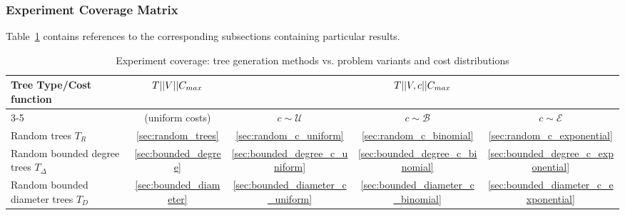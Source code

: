 \subsubsection*{Experiment Coverage Matrix}

Table~\ref{tab:experiment_matrix} contains references to the corresponding subsections containing particular results.

\begin{table}[!h]
\centering
\caption{Experiment coverage: tree generation methods vs. problem variants and cost distributions}
\label{tab:experiment_matrix}
\scriptsize
\begin{tabular}{|l|c|c|c|c|}
\hline
\textbf{Tree Type/Cost function} & $T || V || C_{max}$ & \multicolumn{3}{c|}{$T || V, c || C_{max}$} \\
\cline{3-5}
 & (uniform costs) & $c \sim \mathcal{U}$ & $c \sim \mathcal{B}$ & $c \sim \mathcal{E}$ \\
\hline
Random trees $T_R$ & \ref{sec:random_trees} & \ref{sec:random_c_uniform} & \ref{sec:random_c_binomial} & \ref{sec:random_c_exponential} \\
\hline
Random bounded degree trees $T_{\Delta}$ & \ref{sec:bounded_degree} & \ref{sec:bounded_degree_c_uniform} & \ref{sec:bounded_degree_c_binomial} & \ref{sec:bounded_degree_c_exponential} \\
\hline
Random bounded diameter trees $T_D$ & \ref{sec:bounded_diameter} & \ref{sec:bounded_diameter_c_uniform} & \ref{sec:bounded_diameter_c_binomial} & \ref{sec:bounded_diameter_c_exponential} \\
\hline
\end{tabular}
\end{table}


% 

% 


